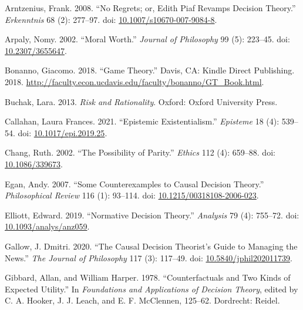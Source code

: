 \documentclass[
  11pt,
  letterpaper,
  DIV=11,
  numbers=noendperiod,
  twoside]{scrartcl}
\newlength{\cslhangindent}
\newenvironment{CSLReferences}[2] %
 {\begin{list}{}{%
  \setlength{\itemindent}{0pt}
  \setlength{\leftmargin}{0pt}
  \setlength{\parsep}{0pt}
  \ifodd #1
   \setlength{\leftmargin}{\cslhangindent}
   \setlength{\itemindent}{-1\cslhangindent}
  \fi
  \setlength{\itemsep}{#2\baselineskip}}}
 {\end{list}}
\begin{document}
\label{refs}
\begin{CSLReferences}{1}{0}
Arntzenius, Frank. 2008. {``No Regrets; or, Edith Piaf Revamps Decision
Theory.''} \emph{Erkenntnis} 68 (2): 277--97. doi:
\href{https://doi.org/10.1007/s10670-007-9084-8}{10.1007/s10670-007-9084-8}.

Arpaly, Nomy. 2002. {``Moral Worth.''} \emph{Journal of Philosophy} 99
(5): 223--45. doi:
\href{https://doi.org/10.2307/3655647}{10.2307/3655647}.

Bonanno, Giacomo. 2018. {``Game Theory.''} Davis, CA: Kindle Direct
Publishing. 2018.
\url{http://faculty.econ.ucdavis.edu/faculty/bonanno/GT_Book.html}.

Buchak, Lara. 2013. \emph{Risk and Rationality}. Oxford: Oxford
University Press.

Callahan, Laura Frances. 2021. {``Epistemic Existentialism.''}
\emph{Episteme} 18 (4): 539--54. doi:
\href{https://doi.org/10.1017/epi.2019.25}{10.1017/epi.2019.25}.

Chang, Ruth. 2002. {``The Possibility of Parity.''} \emph{Ethics} 112
(4): 659--88. doi:
\href{https://doi.org/10.1086/339673}{10.1086/339673}.

Egan, Andy. 2007. {``{Some Counterexamples to Causal Decision
Theory}.''} \emph{Philosophical Review} 116 (1): 93--114. doi:
\href{https://doi.org/10.1215/00318108-2006-023}{10.1215/00318108-2006-023}.

Elliott, Edward. 2019. {``Normative Decision Theory.''} \emph{Analysis}
79 (4): 755--72. doi:
\href{https://doi.org/10.1093/analys/anz059}{10.1093/analys/anz059}.

Gallow, J. Dmitri. 2020. {``The Causal Decision Theorist's Guide to
Managing the News.''} \emph{The Journal of Philosophy} 117 (3): 117--49.
doi:
\href{https://doi.org/10.5840/jphil202011739}{10.5840/jphil202011739}.

Gibbard, Allan, and William Harper. 1978. {``Counterfactuals and Two
Kinds of Expected Utility.''} In \emph{Foundations and Applications of
Decision Theory}, edited by C. A. Hooker, J. J. Leach, and E. F.
McClennen, 125--62. Dordrecht: Reidel.


\end{CSLReferences}
\end{document}
